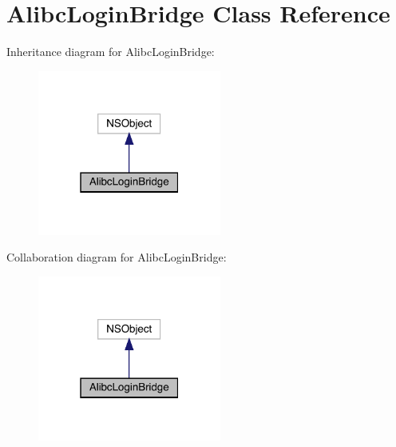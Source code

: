 \hypertarget{interface_alibc_login_bridge}{}\section{Alibc\+Login\+Bridge Class Reference}
\label{interface_alibc_login_bridge}


Inheritance diagram for Alibc\+Login\+Bridge\+:\nopagebreak
\begin{figure}[H]
\begin{center}
\leavevmode
\includegraphics[width=171pt]{interface_alibc_login_bridge__inherit__graph}
\end{center}
\end{figure}


Collaboration diagram for Alibc\+Login\+Bridge\+:\nopagebreak
\begin{figure}[H]
\begin{center}
\leavevmode
\includegraphics[width=171pt]{interface_alibc_login_bridge__coll__graph}
\end{center}
\end{figure}

